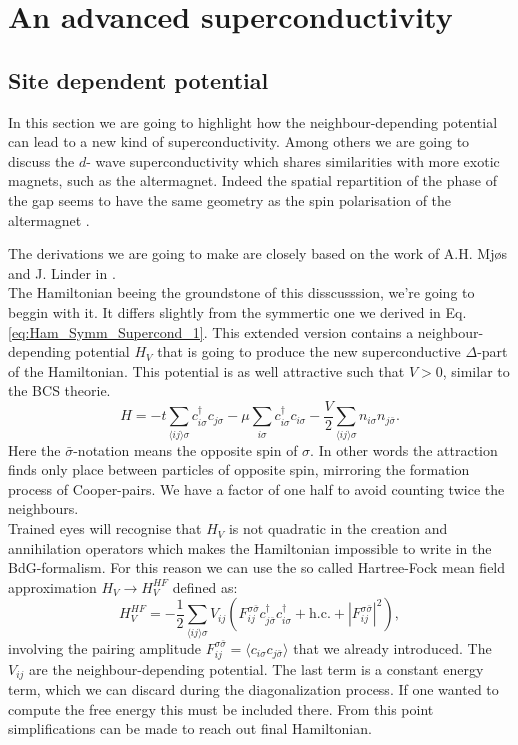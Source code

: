 \documentclass[../main.tex]{subfile}
\begin{document}
\section{An advanced superconductivity}
\subsection{Site dependent potential}
In this section we are going to highlight how the neighbour-depending potential can lead to a new kind of superconductivity. Among others we are going to discuss the $d$-
wave superconductivity which shares similarities with more exotic magnets, such as the altermagnet. 
Indeed the spatial repartition of the phase of the gap seems to have the same geometry as the spin polarisation of the altermagnet \cite{Smejkal2022} .

The derivations we are going to make are closely based on the work of A.H. Mjøs and J. Linder in \cite{Mjos2019}.\\

The Hamiltonian beeing the groundstone of this 
disscusssion, we're going to beggin with it. It differs slightly from the symmertic one we derived in Eq.\ref{eq:Ham_Symm_Supercond_1}. This extended version contains a neighbour-depending potential 
$H_V$ that is going to 
produce the new superconductive $\Delta$-part of the Hamiltonian. This potential is as well attractive such that $V>0$, similar to the BCS theorie.
\begin{equation}
    H = -t\sum_{\langle ij\rangle \sigma} c_{i\sigma}^{\dagger}c_{j\sigma} - \mu \sum_{i\sigma} c_{i\sigma}^{\dagger}c_{i\sigma} - \frac{V}{2} \sum_{\langle ij\rangle \sigma} n_{i\sigma}n_{j\bar{\sigma}}.
\end{equation}
Here the $\bar{\sigma}$-notation means the opposite spin of $\sigma$. In other words the attraction finds only place between particles of opposite spin,
 mirroring the formation process of Cooper-pairs.
We have a factor of one half to avoid counting twice the neighbours.\\

Trained eyes will recognise that $H_V$ is not quadratic in the creation and annihilation operators which makes the Hamiltonian impossible to write in the BdG-formalism. For this reason we can 
use the so called Hartree-Fock mean field approximation $H_V \rightarrow H^{HF}_V$ defined as:
\begin{equation}
    H^{HF}_V = -\frac{1}{2} \sum_{\langle ij\rangle \sigma} V_{ij} \left(F_{ij}^{\sigma \bar{\sigma}} c^{\dagger}_{j\bar{\sigma}}c^{\dagger}_{i\sigma} + \text{h.c.} 
    + |F_{ij}^{\sigma \bar{\sigma}}|^2\right),
\end{equation}
involving the pairing amplitude $F_{ij}^{\sigma \bar{\sigma}} = \langle c_{i\sigma}c_{j\bar{\sigma}}\rangle$ that we already introduced. The $V_{ij}$ are the neighbour-depending potential.
The last term is a constant energy term, which we can discard during the diagonalization process. If one wanted to compute the free energy this must be included there.
From this point simplifications can be made to reach out final Hamiltonian.\\
\end{document}
